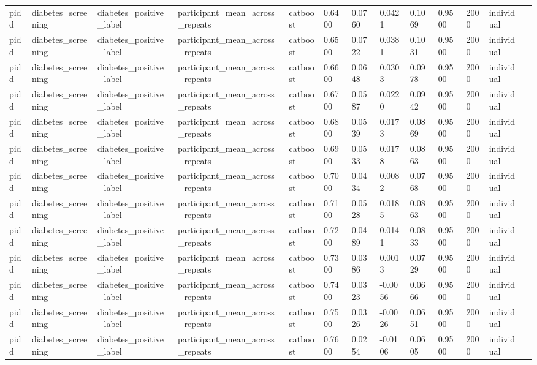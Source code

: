 \begin{tabular}{lllllllllllll}
pidd & diabetes\_screening & diabetes\_positive\_label & participant\_mean\_across\_repeats & catboost & 0.6400 & 0.0760 & 0.0421 & 0.1069 & 0.9500 & 2000 & individual &  \\
pidd & diabetes\_screening & diabetes\_positive\_label & participant\_mean\_across\_repeats & catboost & 0.6500 & 0.0722 & 0.0381 & 0.1031 & 0.9500 & 2000 & individual &  \\
pidd & diabetes\_screening & diabetes\_positive\_label & participant\_mean\_across\_repeats & catboost & 0.6600 & 0.0648 & 0.0303 & 0.0978 & 0.9500 & 2000 & individual &  \\
pidd & diabetes\_screening & diabetes\_positive\_label & participant\_mean\_across\_repeats & catboost & 0.6700 & 0.0587 & 0.0220 & 0.0942 & 0.9500 & 2000 & individual &  \\
pidd & diabetes\_screening & diabetes\_positive\_label & participant\_mean\_across\_repeats & catboost & 0.6800 & 0.0539 & 0.0173 & 0.0869 & 0.9500 & 2000 & individual &  \\
pidd & diabetes\_screening & diabetes\_positive\_label & participant\_mean\_across\_repeats & catboost & 0.6900 & 0.0533 & 0.0178 & 0.0863 & 0.9500 & 2000 & individual &  \\
pidd & diabetes\_screening & diabetes\_positive\_label & participant\_mean\_across\_repeats & catboost & 0.7000 & 0.0434 & 0.0082 & 0.0768 & 0.9500 & 2000 & individual &  \\
pidd & diabetes\_screening & diabetes\_positive\_label & participant\_mean\_across\_repeats & catboost & 0.7100 & 0.0528 & 0.0185 & 0.0863 & 0.9500 & 2000 & individual &  \\
pidd & diabetes\_screening & diabetes\_positive\_label & participant\_mean\_across\_repeats & catboost & 0.7200 & 0.0489 & 0.0141 & 0.0833 & 0.9500 & 2000 & individual &  \\
pidd & diabetes\_screening & diabetes\_positive\_label & participant\_mean\_across\_repeats & catboost & 0.7300 & 0.0386 & 0.0013 & 0.0729 & 0.9500 & 2000 & individual &  \\
pidd & diabetes\_screening & diabetes\_positive\_label & participant\_mean\_across\_repeats & catboost & 0.7400 & 0.0323 & -0.0056 & 0.0666 & 0.9500 & 2000 & individual &  \\
pidd & diabetes\_screening & diabetes\_positive\_label & participant\_mean\_across\_repeats & catboost & 0.7500 & 0.0326 & -0.0026 & 0.0651 & 0.9500 & 2000 & individual &  \\
pidd & diabetes\_screening & diabetes\_positive\_label & participant\_mean\_across\_repeats & catboost & 0.7600 & 0.0254 & -0.0106 & 0.0605 & 0.9500 & 2000 & individual &  \\

\end{tabular}
